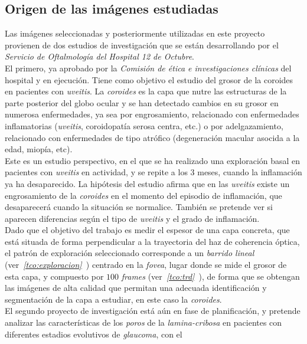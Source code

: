 \subsection{Origen de las imágenes estudiadas}
Las imágenes seleccionadas y posteriormente utilizadas en este
proyecto provienen de dos estudios de investigación que se están
desarrollando por el \emph{Servicio de Oftalmología del Hospital 12 de
  Octubre}.\\
El primero, ya aprobado por la \emph{Comisión de ética e
  investigaciones clínicas} del hospital y en ejecución. Tiene como
objetivo el estudio del grosor de la \gls{coroides} en pacientes con
\emph{\gls{uveitis}}. La \emph{coroides} es la capa que nutre las
estructuras de la parte posterior del globo ocular y se han detectado
cambios en su grosor en numerosa enfermedades, ya sea por
engrosamiento, relacionado con enfermedades inflamatorias
(\emph{\gls{uveitis}}, coroidopatía serosa centra, etc.) o por
adelgazamiento, relacionado con enfermedades de tipo atrófico
(degeneración macular asocida a la edad, miopía, etc).\\
Este es un estudio perspectivo, en el que se ha realizado una
exploración basal en pacientes con \emph{\gls{uveitis}} en actividad,
y se repite a los 3 meses, cuando la inflamación ya ha
desaparecido. La hipótesis del estudio afirma que en las
\emph{\gls{uveitis}} existe un engrosamiento de la
\emph{\gls{coroides}} en el momento del episodio de inflamación, que
desaparecerá cuando la situación se normalice. También se pretende ver
si aparecen diferencias según el tipo de \emph{\gls{uveitis}} y el
grado de inflamación.\\
Dado que el objetivo del trabajo es medir el espesor de una capa
concreta, que está situada de forma perpendicular a la trayectoria del
haz de coherencia óptica, el patrón de exploración seleccionado
corresponde a un \emph{barrido lineal}
(ver\emph{~\ref{tco:exploracion}~}) centrado
en la \emph{\gls{fovea}}, lugar donde se mide el grosor de esta capa,
y compuesto por $100$ \emph{frames}
(ver\emph{~\ref{tco:trd}~}), de forma que se obtengan
las imágenes de alta calidad que permitan una adecuada identificación
y segmentación de la capa a
estudiar, en este caso la \emph{\gls{coroides}}.\\
El segundo proyecto de investigación está aún en fase de
planificación, y pretende analizar las características de los
\emph{poros} de la \emph{\gls{lamina-cribosa}} en pacientes con
diferentes estadios evolutivos de \emph{\gls{glaucoma}}, con el
